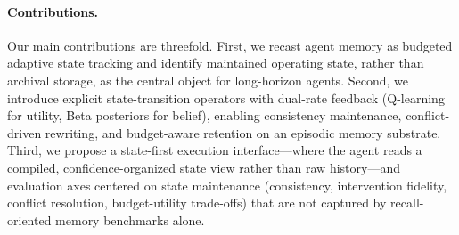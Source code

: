\paragraph{Contributions.}
Our main contributions are threefold. First, we recast agent memory as budgeted adaptive state tracking and identify maintained operating state, rather than archival storage, as the central object for long-horizon agents. Second, we introduce explicit state-transition operators with dual-rate feedback (Q-learning for utility, Beta posteriors for belief), enabling consistency maintenance, conflict-driven rewriting, and budget-aware retention on an episodic memory substrate. Third, we propose a state-first execution interface---where the agent reads a compiled, confidence-organized state view rather than raw history---and evaluation axes centered on state maintenance (consistency, intervention fidelity, conflict resolution, budget-utility trade-offs) that are not captured by recall-oriented memory benchmarks alone.
